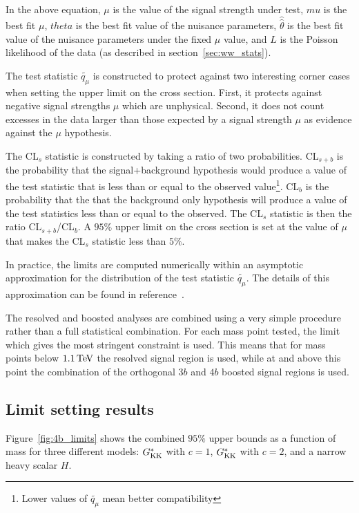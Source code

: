 In the above equation, $\mu$ is the value of the signal strength under test, $\hat{mu}$ is the best fit $\mu$, $\hat{theta}$ is the best fit value of the nuisance parameters, $\hat{\hat{\theta}}$ is the best fit value of the nuisance parameters under the fixed $\mu$ value, and $L$ is the Poisson likelihood of the data (as described in section~\ref{sec:ww_stats}). 

The test statistic $\widetilde{q_{\mu}}$ is constructed to protect against two interesting corner cases when setting the upper limit on the cross section. First, it protects against negative signal strengths $\mu$ which are unphysical. Second, it does not count excesses in the data larger than those expected by a signal strength $\mu$ as evidence against the $\mu$ hypothesis. 

The CL$_{s}$ statistic is constructed by taking a ratio of two probabilities. CL$_{s+b}$ is the probability that the signal+background hypothesis would produce a value of the test statistic that is less than or equal to the observed value\footnote{Lower values of $\widetilde{q_{\mu}}$ mean better compatibility}. CL$_{b}$ is the probability that the that the background only hypothesis will produce a value of the test statistics less than or equal to the observed. The CL$_{s}$ statistic is then the ratio CL$_{s+b}$/CL$_{b}$. A $95\%$ upper limit on the cross section is set at the value of $\mu$ that makes the CL$_{s}$ statistic less than $5\%$. 

In practice, the limits are computed numerically within an asymptotic approximation for the distribution of the test statistic $\widetilde{q_{\mu}}$. The details of this approximation can be found in reference~\cite{Cowan:2010st}. 

The resolved and boosted analyses are combined using a very simple procedure rather than a full statistical combination. For each mass point tested, the limit which gives the most stringent constraint is used. This means that for mass points below $1.1 \TeV$ the resolved signal region is used, while at and above this point the combination of the orthogonal $3b$ and $4b$ boosted signal regions is used. 

\subsection{Limit setting results}

Figure~\ref{fig:4b_limits} shows the combined $95\%$ upper bounds as a function of mass for three different models: $G^*_{\rm KK}$ with $c=1$, $G^*_{\rm KK}$ with $c=2$, and a narrow heavy scalar $H$. 

